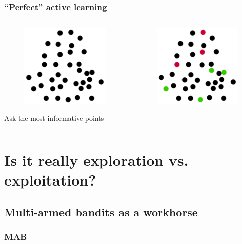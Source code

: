 \documentclass{beamer}
\begin{document}
  \begin{frame}
    \frametitle{``Perfect'' active learning}
    \begin{columns}
      \begin{column}{5cm}
        \begin{figure}
          \includegraphics[scale=.25]{graphics/presentation/clusters2} 
        \end{figure}
        Ask the most informative points\\
      \end{column}
      \begin{column}{5cm}
        \begin{figure}
          \includegraphics[scale=.5]{graphics/presentation/al1} 
        \end{figure}
      \end{column}
    \end{columns}
  \end{frame}


\section{Is it really exploration vs. exploitation?} 
\subsection{Multi-armed bandits as a workhorse}
  \begin{frame}
  \frametitle{MAB}
  \end{frame}
\end{document}
